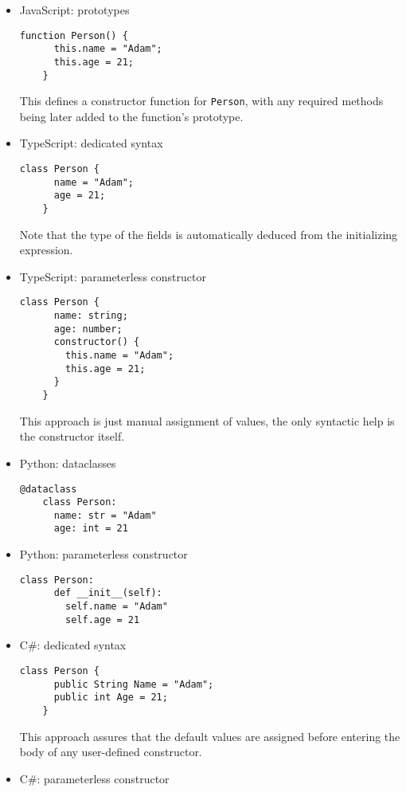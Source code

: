 \documentclass[en]{pracamgr}
\newcommand{\code}[1]{\lstinline[breaklines=true]{#1}}
\begin{document}
\begin{itemize}
  \begin{lstlisting}[style=JavaScript]
    class Person {
      constructor() {
        this.name = "Adam";
        this.age = 21;
      }
    }
  \end{lstlisting}
  \item JavaScript: prototypes
  \begin{lstlisting}[style=JavaScript]
    function Person() {
      this.name = "Adam";
      this.age = 21;
    }
  \end{lstlisting}
  This defines a constructor function for \code{Person}, with any required methods being later added to the function's prototype.
  \item TypeScript: dedicated syntax
  \begin{lstlisting}[style=TypeScript]
    class Person {
      name = "Adam";
      age = 21;
    }
  \end{lstlisting}
  Note that the type of the fields is automatically deduced from the initializing expression.
  \item TypeScript: parameterless constructor
  \begin{lstlisting}[style=TypeScript]
    class Person {
      name: string;
      age: number;
      constructor() {
        this.name = "Adam";
        this.age = 21;
      }
    }
  \end{lstlisting}
  This approach is just manual assignment of values, the only syntactic help is the constructor itself.
  \item Python: dataclasses
  \begin{lstlisting}[style=Python]
    @dataclass
    class Person:
      name: str = "Adam"
      age: int = 21
  \end{lstlisting}
  \item Python: parameterless constructor
  \begin{lstlisting}[style=Python]
    class Person:
      def __init__(self):
        self.name = "Adam"
        self.age = 21
  \end{lstlisting}
  \item C\#: dedicated syntax
  \begin{lstlisting}[style=CSharp]
    class Person {
      public String Name = "Adam";
      public int Age = 21;
    }
  \end{lstlisting}
  This approach assures that the default values are assigned before entering the body of any user-defined constructor.
  \item C\#: parameterless constructor
  \begin{lstlisting}[style=CSharp]

\end{lstlisting}
\end{itemize}
\end{document}
